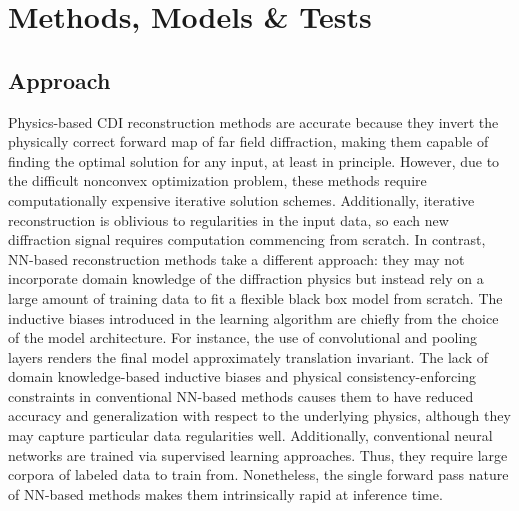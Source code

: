 \documentclass[sn-mathphys]{sn-jnl}%
\theoremstyle{thmstyleone}%
\theoremstyle{thmstyletwo}%
\theoremstyle{thmstylethree}%
\begin{document}

\section{Methods, Models \& Tests}
\subsection{Approach}

Physics-based CDI reconstruction methods are accurate because they invert the physically correct forward map of far field diffraction, making them capable of finding the optimal solution for any input, at least in principle. However, due to the difficult nonconvex optimization problem, these methods require computationally expensive iterative solution schemes. Additionally, iterative reconstruction is oblivious to regularities in the input data, so each new diffraction signal requires computation commencing from scratch. In contrast, NN-based reconstruction methods take a different approach: they may not incorporate domain knowledge of the diffraction physics but instead rely on a large amount of training data to fit a flexible black box model from scratch. The inductive biases introduced in the learning algorithm are chiefly from the choice of the model architecture. For instance, the use of convolutional and pooling layers renders the final model approximately translation invariant. The lack of domain knowledge-based inductive biases and physical consistency-enforcing constraints in conventional NN-based methods causes them to have reduced accuracy and generalization with respect to the underlying physics, although they may capture particular data regularities well. Additionally, conventional neural networks are trained via supervised learning approaches. Thus, they require large corpora of labeled data to train from. Nonetheless, the single forward pass nature of NN-based methods makes them intrinsically rapid at inference time.
\end{document}
